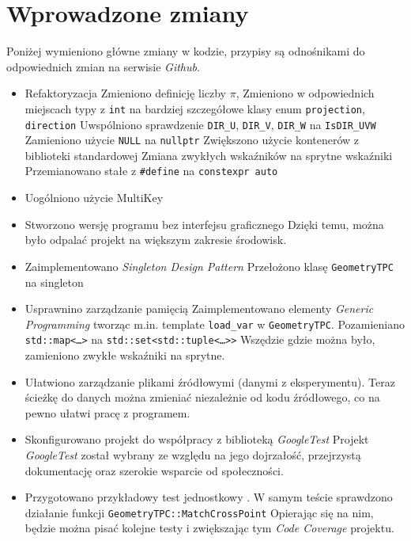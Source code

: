 \documentclass{article}
\begin{document}
\section{Wprowadzone zmiany}
Poniżej wymieniono główne zmiany w kodzie, przypisy są odnośnikami do odpowiednich zmian na serwisie \textit{Github}.
\begin{itemize}
    \item Refaktoryzacja \cite{ref1} \cite{ref2} \cite{ref3}
        \subitem Zmieniono definicję liczby $\pi$,
        \subitem Zmieniono w odpowiednich miejscach typy z \texttt{int} na bardziej szczegółowe klasy enum \texttt{projection}, \texttt{direction}
        \subitem Uwspólniono sprawdzenie \texttt{DIR\_U}, \texttt{DIR\_V}, \texttt{DIR\_W} na \texttt{IsDIR\_UVW}
        \subitem Zamieniono użycie \texttt{NULL} na \texttt{nullptr}
        \subitem Zwiększono użycie kontenerów z biblioteki standardowej
        \subitem Zmiana zwykłych wskaźników na sprytne wskaźniki \cite{pointer} \cite{ms-smart-pointers}
        \subitem Przemianowano stałe z \texttt{\#define} na \texttt{constexpr auto}
    \item Uogólniono użycie MultiKey \cite{multikey}
    \item Stworzono wersję programu bez interfejsu graficznego \cite{batch}
        \subitem Dzięki temu, można było odpalać projekt na większym zakresie środowisk.
    \item Zaimplementowano \textit{Singleton Design Pattern}        \subitem Przełożono klasę \texttt{GeometryTPC} na singleton \cite{geometry-singleton}
    \item Usprawnino zarządzanie pamięcią \cite{memory-improvement}
        \subitem Zaimplementowano elementy \textit{Generic Programming} tworząc m.in. template \texttt{load\_var} w \texttt{GeometryTPC}.
        \subitem Pozamieniano \texttt{std::map<\ldots>} na \texttt{std::set<std::tuple<\ldots>>} \cite{tuple}
        \subitem Wszędzie gdzie można było, zamieniono zwykłe wskaźniki na sprytne.
    \item Ułatwiono zarządzanie plikami źródłowymi (danymi z eksperymentu). Teraz ścieżkę do danych można zmieniać niezależnie od kodu źródłowego, co na pewno ułatwi pracę z programem.
    \item Skonfigurowano projekt do współpracy z biblioteką \textit{GoogleTest}\cite{gtest}
        \subitem Projekt \textit{GoogleTest} został wybrany ze względu na jego dojrzałość, przejrzystą dokumentację oraz szerokie wsparcie od społeczności.
    \item Przygotowano przykładowy test jednostkowy \cite{unit-test}.
        \subitem W samym teście sprawdzono działanie funkcji \texttt{GeometryTPC::MatchCrossPoint}
        \subitem Opierając się na nim, będzie można pisać kolejne testy i zwiększając tym \textit{Code Coverage} projektu.\cite{code-coverage}
\end{itemize}
\end{document}
